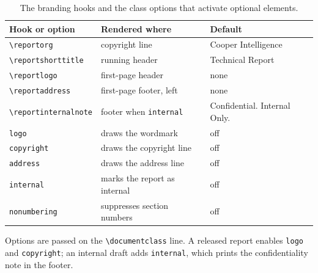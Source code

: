 \begin{table}[htbp]
  \centering
  \caption{The branding hooks and the class options that activate optional elements.}
  \label{tab:hooks}
  \begin{tabular}{@{}lll@{}}
    \toprule
    Hook or option & Rendered where & Default \\
    \midrule
    \verb|\reportorg|        & copyright line            & Cooper Intelligence \\
    \verb|\reportshorttitle| & running header            & Technical Report \\
    \verb|\reportlogo|       & first-page header         & none \\
    \verb|\reportaddress|    & first-page footer, left   & none \\
    \verb|\reportinternalnote| & footer when \texttt{internal} & Confidential. Internal Only. \\
    \midrule
    \texttt{logo}     & draws the wordmark               & off \\
    \texttt{copyright}& draws the copyright line         & off \\
    \texttt{address}  & draws the address line           & off \\
    \texttt{internal} & marks the report as internal     & off \\
    \texttt{nonumbering} & suppresses section numbers     & off \\
    \bottomrule
  \end{tabular}
\end{table}

Options are passed on the \verb|\documentclass| line. A released report enables \verb|logo|
and \verb|copyright|; an internal draft adds \verb|internal|, which prints the confidentiality
note in the footer.
